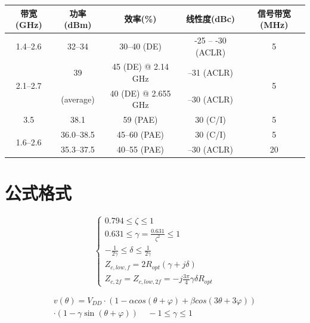	\begin{table}[h]
		\renewcommand{\arraystretch}{1.5}
		\label{tab_1}
		\centering
		\wuhao
		\begin{tabular}{c c c c c }
			\hline
			{\textbf{带宽}(GHz)}&{\textbf{功率}(dBm)}&{\textbf{效率}(\%)}&{\textbf{线性度}(dBc)}&{\textbf{信号带宽}(MHz)}\\
			\hline
			1.4--2.6&32--34&30--40 (DE)&-25 -- -30 (ACLR)&5\\
			\hline
			\multirow{2}{*}{2.1--2.7}&39&45 (DE) @ 2.14 GHz&--31 (ACLR)&\multirow{2}{*}{5}\\\cline{3-4}
			&(average)&40 (DE) @ 2.655 GHz&--30 (ACLR)&\\
			\hline
			3.5&38.1&59 (PAE)&30 (C/I)&5\\
			\hline
			\multirow{2}{*}{1.6--2.6}&36.0--38.5&45--60 (PAE)&30 (C/I)&5\\\cline{2-5}
			&35.3--37.5&40--55 (PAE)&--30 (ACLR)&20\\
			\hline
		\end{tabular}
	\end{table}
	
	
	\section{公式格式}
	
	\begin{equation}
		\left\{ \begin{aligned}
			0.794 \le \zeta  \le 1 ~~~~~~~~~~~\\
			0.631 \le \gamma  = \frac{{0.631}}{{{\zeta ^2}}} \le 1~~~~~~ \\
			- \frac{1}{{2\gamma }} \le \delta  \le \frac{1}{{2\gamma }}~~~~~~~~~~~ \\
			{Z_{c,low,f}} = 2{R_{opt}}(\gamma  + j\delta )~~~~~\\
			{Z_{c,2f}} = {Z_{c,low,2f}} =  - j\frac{{3\pi }}{4}\gamma \delta {R_{opt}}
		\end{aligned} \right.
		\label{eq:3.1}
	\end{equation}
	
	\begin{equation}
		\begin{aligned}
			v(\theta ) = V_{DD}\cdot(1 - \alpha cos(\theta  + \varphi ) + \beta cos(3\theta  + 3\varphi ))\\
			\cdot(1 - \gamma \sin (\theta  + \varphi )) ~~~~~- 1 \le \gamma  \le 1\
		\end{aligned}
		\label{eq:vd}
	\end{equation}
	
